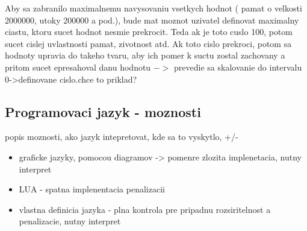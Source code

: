 \documentclass[a4paper,11pt,final]{report}
\begin{document}
Aby sa zabranilo maximalnemu navysovaniu vsetkych hodnot ( pamat o velkosti 2000000, utoky 200000 a pod.), bude mat moznot uzivatel definovat maximalny ciastu, ktoru sucet hodnot nesmie prekrocit. Teda ak je toto cuslo 100, potom sucet cislej uvlastnosti pamat, zivotnost atd. Ak toto cislo prekroci, potom sa hodnoty upravia do takeho tvaru, aby ich pomer k suctu zostal zachovany a pritom sucet epresahoval danu hodnotu $->$ prevedie sa skalovanie do intervalu 0->definovane cislo.chce to priklad? 

\subsection{Programovaci jazyk - moznosti}
popis moznosti, ako jazyk intepretovat, kde sa to vyskytlo, +/-
\begin{itemize}
\item graficke jazyky, pomocou diagramov -> pomenre zlozita implenetacia, nutny interpret
\item LUA - spatna implenentacia penalizacii
\item vlastna definicia jazyka - plna kontrola pre pripadnu rozsiritelnost a penalizacie, nutny interpret
\end{itemize}
\end{document}
